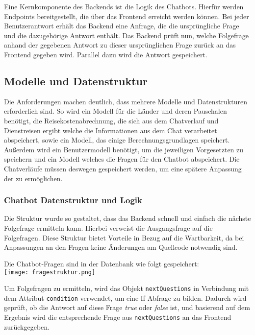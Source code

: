 Eine Kernkomponente des Backends ist die Logik des Chatbots. Hierfür werden Endpoints bereitgestellt, die über das Frontend erreicht werden können. Bei jeder Benutzerantwort erhält das Backend eine Anfrage, die die ursprüngliche Frage und die dazugehörige Antwort enthält. Das Backend prüft nun, welche Folgefrage anhand der gegebenen Antwort zu dieser ursprünglichen Frage zurück an das Frontend gegeben wird. Parallel dazu wird die Antwort gespeichert.

\subsection{Modelle und Datenstruktur}
\label{sec:Planungsphase:ModelleDatenstruktur}

Die Anforderungen machen deutlich, dass mehrere Modelle und Datenstrukturen erforderlich sind. So wird ein Modell für die Länder und deren Pauschalen benötigt, die Reisekostenabrechnung, die sich aus dem Chatverlauf und Dienstreisen ergibt welche die Informationen aus dem Chat verarbeitet abspeichert, sowie ein Modell, das einige Berechnungsgrundlagen speichert. Außerdem wird ein Benutzermodell benötigt, um die jeweiligen Vorgesetzten zu speichern und ein Modell welches die Fragen für den Chatbot abspeichert.
Die Chatverläufe müssen deswegen gespeichert werden, um eine spätere Anpassung der  zu ermöglichen.

\subsubsection{Chatbot Datenstruktur und Logik}
\label{sec:ModelleDatenstruktur:ChatbotDatenstrukturLogik}

Die Struktur wurde so gestaltet, dass das Backend schnell und einfach die nächste Folgefrage ermitteln kann. Hierbei verweist die Ausgangsfrage auf die Folgefragen.
Diese Struktur bietet Vorteile in Bezug auf die Wartbarkeit, da bei Anpassungen an den Fragen keine Änderungen am Quellcode notwendig sind.

Die Chatbot-Fragen sind in der Datenbank wie folgt gespeichert:\\
\texttt{[image: fragestruktur.png]}

Um Folgefragen zu ermitteln, wird das Objekt \verb|nextQuestions| in Verbindung mit dem Attribut \verb|condition| verwendet, um eine If-Abfrage zu bilden. Dadurch wird geprüft, ob die Antwort auf diese Frage \textit{true} oder \textit{false} ist, und basierend auf dem Ergebnis wird die entsprechende Frage aus \verb|nextQuestions| an das Frontend zurückgegeben.

